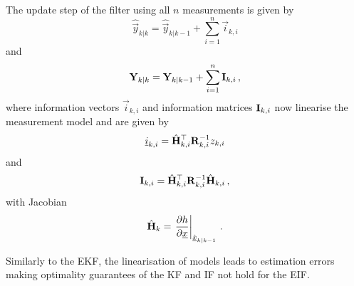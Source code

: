 The update step of the filter using all $n$ measurements is given by
\begin{equation}\label{eq:prelims:eif_info_vec_update}
    \hat{\vec{y}}_{k|k} = \hat{\vec{y}}_{k|k-1} + \sum_{i=1}^n\vec{i}_{k,i}
\end{equation}
and
\begin{equation}\label{eq:prelims:eif_info_mat_update}
    {\ensuremath{{\mathbf{Y}}}}_{k|k} = {{\mathbf{Y}}}_{k|k-1} + \sum_{i=1}^n{{\mathbf{I}}}_{k,i}\,,
\end{equation}
where information vectors $\vec{i}_{k,i}$ and information matrices ${{\mathbf{I}}}_{k,i}$ now linearise the measurement model and are given by
\begin{equation}\label{eq:prelims:eif_measurement_vec_defn}
    {\underline{i}}_{k,i} = \hat{{{\mathbf{H}}}}_{k,i}^\top{\ensuremath{{\mathbf{R}}}}_{k,i}^{-1}z_{k,i}
\end{equation}
and
\begin{equation}\label{eq:prelims:eif_measurement_mat_defn}
    {\ensuremath{{\mathbf{I}}}}_{k,i} = \hat{{{\mathbf{H}}}}_{k,i}^\top{\ensuremath{{\mathbf{R}}}}_{k,i}^{-1}\hat{{{\mathbf{H}}}}_{k,i}\,,
\end{equation}
with Jacobian
\begin{equation}
    \hat{{{\mathbf{H}}}}_k = \left.\frac{\partial h}{\partial {\underline{x}}}\right|_{\hat{{\underline{x}}}_{k|k-1}}\,.
\end{equation}

Similarly to the EKF, the linearisation of models leads to estimation errors making optimality guarantees of the KF and IF not hold for the EIF.



% 
% 


